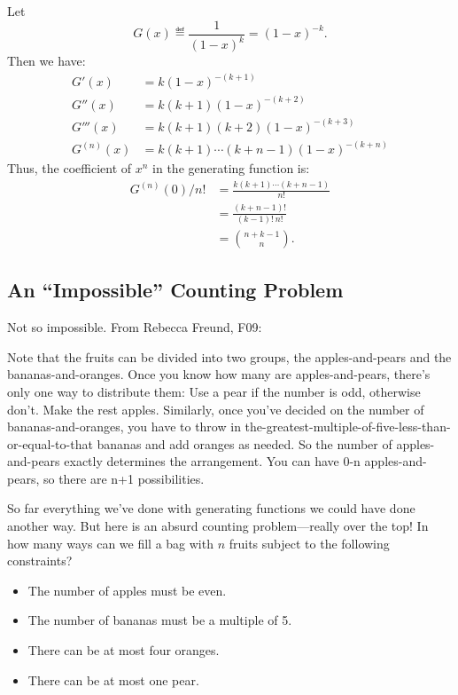 \begin{editingnotes}
Let
%
\[
G(x) \eqdef \frac{1}{(1-x)^k} = (1-x)^{-k}.
\]
%
Then we have:
%
\begin{align*}
G'(x) & = k (1-x)^{-(k+1)} \\
G''(x) & = k (k+1) (1-x)^{-(k+2)} \\
G'''(x) & = k (k+1) (k+2) (1-x)^{-(k+3)} \\
G^{(n)}(x) & = k (k+1) \cdots (k + n - 1)(1-x)^{-(k+n)}
\end{align*}
%
Thus, the coefficient of $x^n$ in the generating function is:
%
\begin{align*}
G^{(n)}(0) / n! & = \frac{k (k+1) \cdots (k + n - 1)}{n!} \\
                & = \frac{(k + n - 1)!}{(k - 1)! \ n!} \\
                & = \binom{n + k - 1}{n}.
\end{align*}

\end{editingnotes}

\subsection{An ``Impossible'' Counting Problem}
\label{sec:impossible_counting}

\begin{editingnotes}

Not so impossible.  From Rebecca Freund, F09:

Note that the fruits can be divided into two groups, the apples-and-pears
and the bananas-and-oranges. Once you know how many are apples-and-pears,
there's only one way to distribute them: Use a pear if the number is odd,
otherwise don't. Make the rest apples. Similarly, once you've decided on
the number of bananas-and-oranges, you have to throw in
the-greatest-multiple-of-five-less-than-or-equal-to-that bananas and add
oranges as needed. So the number of apples-and-pears exactly determines
the arrangement. You can have 0-n apples-and-pears, so there are n+1
possibilities.

\end{editingnotes}

So far everything we've done with generating functions we could have
done another way.  But here is an absurd counting problem---really
over the top!  In how many ways can we fill a bag with $n$ fruits
subject to the following constraints?

\begin{itemize}
\item The number of apples must be even.
\item The number of bananas must be a multiple of 5.
\item There can be at most four oranges.
\item There can be at most one pear.
\end{itemize}

